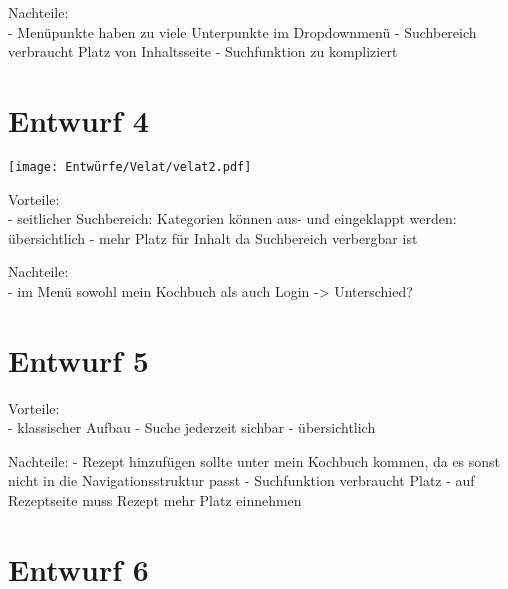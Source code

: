 \documentclass[parskip,10pt,abstracton]{scrartcl}
\begin{document}
Nachteile:\\
- Menüpunkte haben zu viele Unterpunkte im Dropdownmenü
- Suchbereich verbraucht Platz von Inhaltsseite
- Suchfunktion zu kompliziert

\section*{Entwurf 4} %

\texttt{[image: Entwürfe/Velat/velat2.pdf]}


Vorteile:\\
- seitlicher Suchbereich: Kategorien können aus- und eingeklappt werden: übersichtlich
- mehr Platz für Inhalt da Suchbereich verbergbar ist

Nachteile:\\
- im Menü sowohl mein Kochbuch als auch Login -> Unterschied?


\section*{Entwurf 5} %




Vorteile: \\
- klassischer Aufbau
- Suche jederzeit sichbar
- übersichtlich

Nachteile:
- Rezept hinzufügen sollte unter mein Kochbuch kommen, da es sonst nicht in die Navigationsstruktur passt
- Suchfunktion verbraucht Platz
- auf Rezeptseite muss Rezept mehr Platz einnehmen

\section*{Entwurf 6} %

\end{document}
